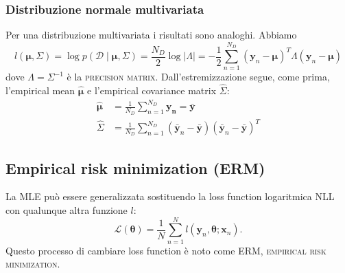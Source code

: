 \documentclass[10pt]{article}
\newcommand{\ve}[1]{\bm{#1}}
\newcommand{\HALF}{\frac{1}{2}}
\newcommand{\im}[1]{\textsc{#1}}
\newcommand{\cond}{\mid}
\newcommand{\pare}[1]{
	\ensuremath{\left(#1\right)}
}
\theoremstyle{definition}
\begin{document}
\subsubsection{Distribuzione normale multivariata}
Per una distribuzione multivariata i risultati sono analoghi. Abbiamo
\begin{equation}
l\pare{\ve{\mu}, \Sigma} = \log p\pare{\mathcal{D}\cond\ve{\mu},\Sigma} = \frac{N_D}{2}\log\left|\Lambda\right| = -\HALF\sum_{n=1}^{N_D}\pare{\ve{y}_n - \ve{\mu}}^T \Lambda\pare{\ve{y}_n - \ve{\mu}}
\end{equation}
dove $\Lambda = \Sigma^{-1}$ è la \im{precision matrix}. Dall'estremizzazione
segue, come prima, l'empirical mean $\hat{\ve{\mu}}$ e l'empirical covariance
matrix $\hat{\Sigma}$:
\begin{align}
\hat{\ve{\mu}} &= \frac{1}{N_D}\sum_{n=1}^{N_D}\ve{y_n} = \bar{\ve{y}} \\
\hat{\Sigma} &= \frac{1}{N_D}\sum_{n=1}^{N_D}\pare{\bar{\ve{y}}_n - \bar{\ve{y}}}\pare{\bar{\ve{y}}_n - \bar{\ve{y}}}^T 
\end{align}

\subsection{Empirical risk minimization (ERM)}
La MLE può essere generalizzata sostituendo la loss function logaritmica NLL con qualunque altra funzione $l$:
\begin{equation}
\mathcal{L}\pare{\ve{\theta}} = \frac{1}{N}\sum_{n=1}^N l\pare{\ve{y}_n, \ve{\theta}; \ve{x}_n}.
\end{equation}
Questo processo di cambiare loss function è noto come ERM, \im{empirical risk minimization}. %
\end{document}

